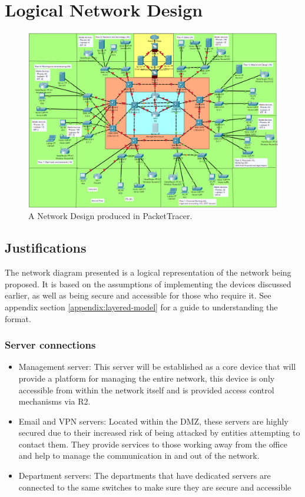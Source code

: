 \chapter{Logical Network Design}

\begin{figure}[ht]
    \includegraphics[width=15cm]{Figures/Network_Diagram.png}
    \caption{A Network Design produced in PacketTracer.}
    \label{fig:Network_Diagram}
\end{figure}



\section{Justifications}

The network diagram presented is a logical representation of the network being proposed. It is based on the assumptions of implementing the devices discussed earlier, as well as being secure and accessible for those who require it. See appendix section \ref{appendix:layered-model} for a guide to understanding the format.

\subsection{Server connections}
\begin{itemize}
    \item Management server: This server will be established as a core device that will provide a platform for managing the entire network, this device is only accessible from within the network itself and is provided access control mechanisms via R2.
    \item Email and VPN servers: Located within the DMZ, these servers are highly secured due to their increased risk of being attacked by entities attempting to contact them. They provide services to those working away from the office and help to manage the communication in and out of the network.
    \item Department servers: The departments that have dedicated servers are connected to the same switches to make sure they are secure and accessible
\end{itemize}
